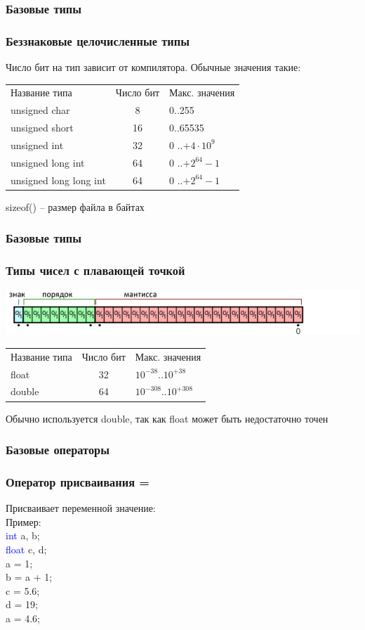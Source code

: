 \documentclass[12pt,pdf,hyperref={unicode}]{beamer}
\begin{document}
\begin{frame}
\frametitle{Базовые типы}
\frametitle{Беззнаковые целочисленные типы} 
Число бит на тип зависит от компилятора. Обычные значения такие:
\begin{center}
\begin{tabular}{ l c l }
  Название типа & Число бит & Макс. значения \\
  unsigned char & 8 & 0..255 \\
  unsigned short & 16 & 0..65535 \\
  unsigned int & 32 & $0$ ..$+4 \cdot 10^9$ \\
  unsigned long int & 64& $0$ ..$+2^{64}-1$ \\
  unsigned long long int & 64 & $0$ ..$+2^{64}-1$ \\
\end{tabular}
\end{center}
sizeof() -- размер файла в байтах
\end{frame}


\begin{frame}
\frametitle{Базовые типы}
\frametitle{Типы чисел с плавающей точкой} 
\includegraphics[scale=0.6]{images/floats.png}
\begin{center}
\begin{tabular}{ l c l }
  Название типа & Число бит & Макс. значения \\
  float & 32 & $10^{-38}$..$10^{+38}$ \\
  double & 64 & $10^{-308}$..$10^{+308}$ \\
\end{tabular}
\end{center}
Обычно используется double, так как float может быть недостаточно точен
\end{frame}

\begin{frame}
\frametitle{Базовые операторы}
\frametitle{Оператор присваивания =} 
Присваивает переменной значение:\\
Пример:\\
\quad \textcolor{blue}{int} a, b;\\
\quad \textcolor{blue}{float} c, d;\\
\quad a = 1;\\
\quad b = a + 1;\\
\quad c = 5.6;\\
\quad d = 19;\\
\quad a = 4.6;\\

\end{frame}
\end{document}
